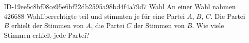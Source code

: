 \begin{exercise}
      {ID-19ee5c8bf08ce95e6bf22db2595a98bd4f4a79d7}
      {Wahl}
  \ifproblem\problem
    An einer Wahl nahmen \num{426688} Wahllberechtigte teil und stimmten je für eine
    Partei $A$, $B$, $C$. Die Partei $B$ erhielt  der Stimmen von $A$,
    die Partei $C$  der Stimmen von $B$.
    Wie viele Stimmen erhielt jede Partei?
  \fi
\end{exercise}
